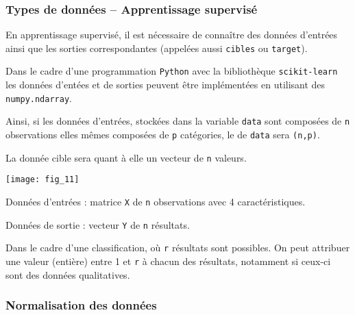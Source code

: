 \subsubsection{Types de données -- Apprentissage supervisé}

En apprentissage supervisé, il est nécessaire de connaître des données d'entrées ainsi que les sorties correspondantes (appelées aussi \texttt{cibles} ou \texttt{target}).

Dans le cadre d'une programmation \texttt{Python} avec la bibliothèque \texttt{scikit-learn} les données d'entées et de sorties peuvent être implémentées en utilisant des \texttt{numpy.ndarray}.

Ainsi, si les données d'entrées, stockées dans la variable \texttt{data} sont composées de \texttt{n} observations elles mêmes composées de \texttt{p} catégories, le  de \texttt{data} sera \texttt{(n,p)}.

La donnée cible sera quant à elle un vecteur de \texttt{n} valeurs. 

\begin{marginfigure}
\texttt{[image: fig\_11]}
\end{marginfigure}

\begin{exemple}
Données d'entrées  : matrice  \texttt{X} de \texttt{n} observations avec 4 caractéristiques. 

Données de sortie : vecteur \texttt{Y} de \texttt{n} résultats. 

Dans le cadre d'une classification, où \texttt{r} résultats sont possibles. On peut attribuer une valeur (entière) entre 1 et \texttt{r} à chacun des résultats, notamment si ceux-ci sont des données qualitatives.


\end{exemple}


\subsubsection{Normalisation des données }


